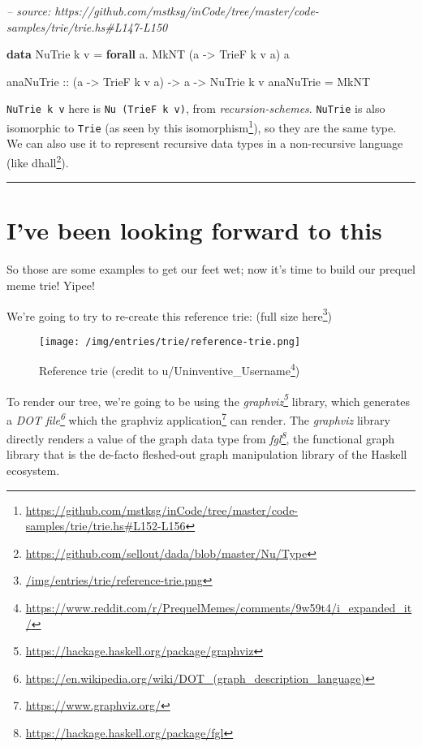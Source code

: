 \documentclass[]{article}
\newenvironment{Shaded}{}{}
\newcommand{\CommentTok}[1]{\textcolor[rgb]{0.38,0.63,0.69}{\textit{#1}}}
\newcommand{\DataTypeTok}[1]{\textcolor[rgb]{0.56,0.13,0.00}{#1}}
\newcommand{\FunctionTok}[1]{\textcolor[rgb]{0.02,0.16,0.49}{#1}}
\newcommand{\KeywordTok}[1]{\textcolor[rgb]{0.00,0.44,0.13}{\textbf{#1}}}
\newcommand{\NormalTok}[1]{#1}
\newcommand{\OtherTok}[1]{\textcolor[rgb]{0.00,0.44,0.13}{#1}}
\renewcommand{\href}[2]{#2\footnote{\url{#1}}}
\begin{document}
\begin{Shaded}
\begin{Highlighting}[]
\CommentTok{-- source: https://github.com/mstksg/inCode/tree/master/code-samples/trie/trie.hs#L147-L150}

\KeywordTok{data} \DataTypeTok{NuTrie}\NormalTok{ k v }\FunctionTok{=} \KeywordTok{forall}\NormalTok{ a}\FunctionTok{.} \DataTypeTok{MkNT}\NormalTok{ (a }\OtherTok{->} \DataTypeTok{TrieF}\NormalTok{ k v a) a}

\OtherTok{anaNuTrie ::}\NormalTok{ (a }\OtherTok{->} \DataTypeTok{TrieF}\NormalTok{ k v a) }\OtherTok{->}\NormalTok{ a }\OtherTok{->} \DataTypeTok{NuTrie}\NormalTok{ k v }
\NormalTok{anaNuTrie }\FunctionTok{=} \DataTypeTok{MkNT}
\end{Highlighting}
\end{Shaded}

\texttt{NuTrie\ k\ v} here is \texttt{Nu\ (TrieF\ k\ v)}, from
\emph{recursion-schemes}. \texttt{NuTrie} is also isomorphic to \texttt{Trie}
(as seen by
\href{https://github.com/mstksg/inCode/tree/master/code-samples/trie/trie.hs\#L152-L156}{this
isomorphism}), so they are the same type. We can also use it to represent
recursive data types in a non-recursive language (like
\href{https://github.com/sellout/dada/blob/master/Nu/Type}{dhall}).

\begin{center}\rule{0.5\linewidth}{\linethickness}\end{center}

\hypertarget{ive-been-looking-forward-to-this}{%
\section{I've been looking forward to
this}\label{ive-been-looking-forward-to-this}}

So those are some examples to get our feet wet; now it's time to build our
prequel meme trie! Yipee!

We're going to try to re-create this reference trie:
(\href{/img/entries/trie/reference-trie.png}{full size here})

\begin{figure}
\centering
\texttt{[image: /img/entries/trie/reference-trie.png]}
\caption{Reference trie (credit to
\href{https://www.reddit.com/r/PrequelMemes/comments/9w59t4/i_expanded_it/}{u/Uninventive\_Username})}
\end{figure}

To render our tree, we're going to be using the
\emph{\href{https://hackage.haskell.org/package/graphviz}{graphviz}} library,
which generates a
\emph{\href{https://en.wikipedia.org/wiki/DOT_(graph_description_language)}{DOT
file}} which the \href{https://www.graphviz.org/}{graphviz application} can
render. The \emph{graphviz} library directly renders a value of the graph data
type from \emph{\href{https://hackage.haskell.org/package/fgl}{fgl}}, the
functional graph library that is the de-facto fleshed-out graph manipulation
library of the Haskell ecosystem.
\end{document}
